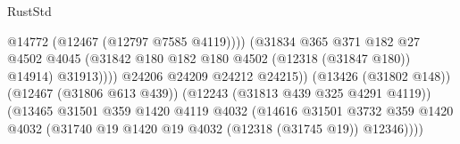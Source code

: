 \begin{lexlean}{RustStd}
\begin{coremodule}
                                                          @14772
                                                          (@12467 (@12797 @7585 @4119))))
                                                      (@31834
                                                        @365
                                                        @371
                                                        @182
                                                        @27
                                                        @4502
                                                        @4045
                                                        (@31842
                                                          @180
                                                          @182
                                                          @180
                                                          @4502
                                                          (@12318 (@31847 @180))
                                                          @14914)
                                                        @31913))))
                                                @24206
                                                @24209
                                                @24212
                                                @24215))
                                            (@13426 (@31802 @148))
                                            (@12467 (@31806 @613 @439))
                                            (@12243 (@31813 @439 @325 @4291 @4119))
                                            (@13465
                                              @31501
                                              @359
                                              @1420
                                              @4119
                                              @4032
                                              (@14616
                                                @31501
                                                @3732
                                                @359
                                                @1420
                                                @4032
                                                (@31740
                                                  @19
                                                  @1420
                                                  @19
                                                  @4032
                                                  (@12318 (@31745 @19))
                                                  @12346))))

\end{coremodule}
\end{lexlean}
